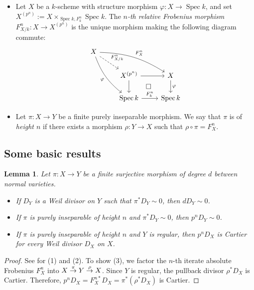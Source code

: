 \documentclass[10pt,abstract=true]{scrartcl}
\numberwithin{equation}{section}
\newtheorem{lemma}[theorem]{Lemma}
\theoremstyle{definition}
\theoremstyle{remark}
\begin{document}
\begin{itemize}
  \item Let $X$ be a $k$-scheme with structure morphism $\varphi\colon X\to\operatorname{Spec}k$, and set $X^{(p^n)}:=X\times_{\operatorname{Spec}k,F_k^n}\operatorname{Spec}k$.
The \emph{$n$-th relative Frobenius morphism} $F^n_{X/k}\colon X\to X^{(p^n)}$ is the unique morphism making the following diagram commute:
\[
  \begin{tikzcd}
    X \ar[rd,dashed,"F^n_{X/k}"] \ar[rrd,bend left=15,"F_X^n"] \ar[rdd,bend right=15,"\varphi"']\\
    & X^{(p^n)} \rar\dar\ar[rd,phantom,"\square"] & X \dar{\varphi} \\
    & \mathrm{Spec}\, k \rar{F_k^n} & \mathrm{Spec}\, k
  \end{tikzcd}
\]
  \item Let $\pi\colon X\to Y$ be a finite purely inseparable morphism.
We say that $\pi$ is of \emph{height $n$} if there exists a morphism $\rho\colon Y\to X$ such that $\rho\circ\pi=F_X^n$.
\end{itemize}


\subsection{Some basic results}\label{sec:singularities-field-extensions}%
\begin{lemma}\label{lemma-finite-Cartier}%
  Let $\pi\colon X\to Y$ be a finite surjective morphism of degree $d$ between normal varieties.
  \begin{itemize}
    \item[\textup{(1)}] If $D_Y$ is a Weil divisor on $Y$ such that
      $\pi^*D_Y\sim0$, then $dD_Y\sim0$.
    \item[\textup{(2)}] If $\pi$ is purely inseparable of height $n$ and
      $\pi^*D_Y\sim0$, then $p^nD_Y\sim0$.
    \item[\textup{(3)}] If $\pi$ is purely inseparable of height $n$ and $Y$ is
      regular, then $p^nD_X$ is Cartier for every Weil divisor $D_X$ on $X$.
  \end{itemize}
\end{lemma}
\begin{proof}
  See \cite[Lemma~6.8]{CWZ-classification} for (1) and (2).
  To show (3), we factor the $n$-th iterate absolute Frobenius $F^n_X$ into $X \buildrel \pi\over\to Y \buildrel \rho\over\to X$.
  Since $Y$ is regular, the pullback divisor $\rho^*D_X$ is Cartier.
  Therefore, $p^nD_X = F_X^{n*} D_X = \pi^*(\rho^*D_X)$ is Cartier.
\end{proof}
\end{document}
